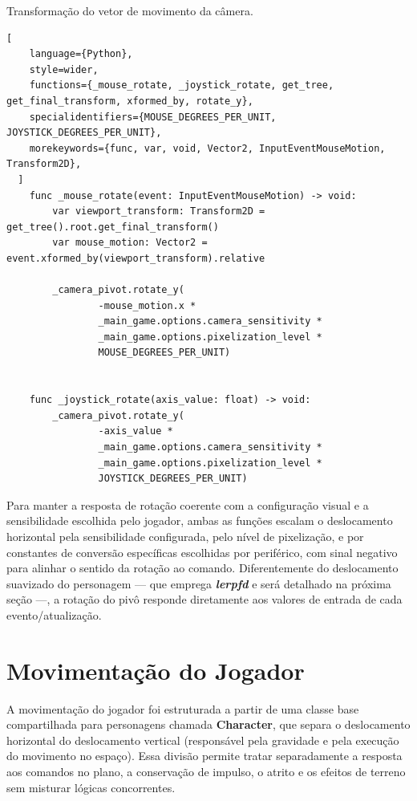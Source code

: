 \begin{programruledcaption}{Transformação do vetor de movimento da câmera.\label{prog:camera}}
  \begin{lstlisting}[
    language={Python},
    style=wider,
    functions={_mouse_rotate, _joystick_rotate, get_tree, get_final_transform, xformed_by, rotate_y},
    specialidentifiers={MOUSE_DEGREES_PER_UNIT, JOYSTICK_DEGREES_PER_UNIT},
	morekeywords={func, var, void, Vector2, InputEventMouseMotion, Transform2D},
  ]
    func _mouse_rotate(event: InputEventMouseMotion) -> void:
		var viewport_transform: Transform2D = get_tree().root.get_final_transform()
		var mouse_motion: Vector2 = event.xformed_by(viewport_transform).relative
		
		_camera_pivot.rotate_y(
				-mouse_motion.x *
				_main_game.options.camera_sensitivity *
				_main_game.options.pixelization_level *
				MOUSE_DEGREES_PER_UNIT)


	func _joystick_rotate(axis_value: float) -> void:
		_camera_pivot.rotate_y(
				-axis_value *
				_main_game.options.camera_sensitivity *
				_main_game.options.pixelization_level *
				JOYSTICK_DEGREES_PER_UNIT)

  \end{lstlisting}
\end{programruledcaption}

Para manter a resposta de rotação coerente com a configuração visual e a
sensibilidade escolhida pelo jogador, ambas as funções escalam o
deslocamento horizontal pela sensibilidade configurada, pelo nível de pixelização,
e por constantes de conversão específicas escolhidas por periférico, com sinal negativo para alinhar o sentido
da rotação ao comando. Diferentemente do deslocamento suavizado do personagem
--- que emprega \textbf{\textit{lerpfd}} e será detalhado na próxima seção ---, a rotação do
pivô responde diretamente aos valores de entrada de cada evento/atualização.

\section{Movimentação do Jogador}
\label{sec:movimentacao_do_jogador}

A movimentação do jogador foi estruturada a partir de uma classe base compartilhada para
personagens chamada \textbf{Character}, que separa o deslocamento horizontal do deslocamento vertical (responsável pela
gravidade e pela execução do movimento no espaço). Essa divisão permite tratar separadamente a
resposta aos comandos no plano, a conservação de impulso, o atrito e os efeitos de terreno sem
misturar lógicas concorrentes.

